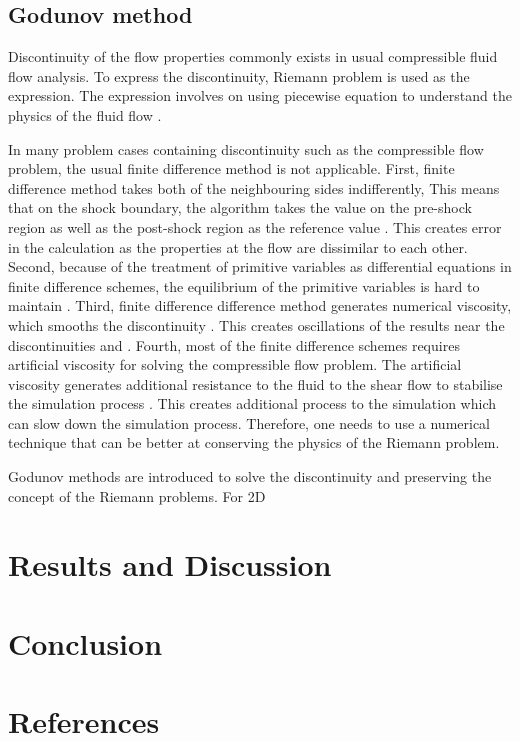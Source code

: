 \documentclass[11pt]{article}
\begin{document}
\subsection{Godunov method}
\label{ssc:godmethod}
Discontinuity of the flow properties commonly exists in usual compressible fluid flow analysis. To express the discontinuity, Riemann problem is used as the expression. The expression involves on using piecewise equation to understand the physics of the fluid flow \citep{Zhao2019}. \par
\medskip
In many problem cases containing discontinuity such as the compressible flow problem, the usual finite difference method is not applicable. First, finite difference method takes both of the neighbouring sides indifferently, This means that on the shock boundary, the algorithm takes the value on the pre-shock region as well as the post-shock region as the reference value \citep{Mao1992}. This creates error in the calculation as the properties at the flow are dissimilar to each other. Second, because of the treatment of primitive variables as differential equations in finite difference schemes, the equilibrium of the primitive variables is hard to maintain \citep{Zheng2021}. Third, finite difference difference method generates numerical viscosity, which smooths the discontinuity \citep{INL2024}. This creates oscillations of the results near the discontinuities and \citep{Ullrich2010}. Fourth, most of the finite difference schemes requires artificial viscosity for solving the compressible flow problem. The artificial viscosity generates additional resistance to the fluid to the shear flow to stabilise the simulation process \citep{Margolin2022}. This creates additional process to the simulation which can slow down the simulation process. Therefore, one needs to use a numerical technique that can be better at conserving the physics of the Riemann problem.\par
\medskip
Godunov methods are introduced to solve the discontinuity and preserving the concept of the Riemann problems. For 2D


\section{Results and Discussion}

\section{Conclusion}



\section{References}
{}
\end{document}
